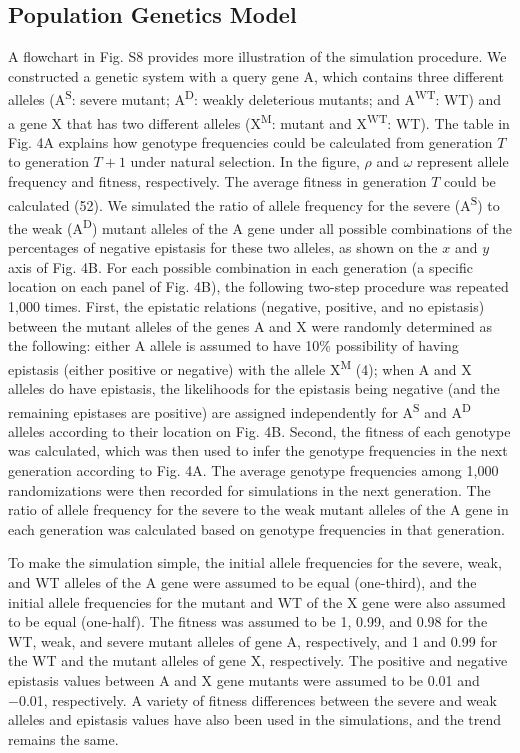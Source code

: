 \subsection{Population Genetics Model} A flowchart in Fig. S8 provides
more illustration of the simulation procedure. We constructed a
genetic system with a query gene A, which contains three different
alleles (A\textsuperscript{S}: severe mutant; A\textsuperscript{D}:
weakly deleterious mutants; and A\textsuperscript{WT}: WT) and a gene
X that has two different alleles (X\textsuperscript{M}: mutant and
X\textsuperscript{WT}: WT). The table in Fig. 4A explains how genotype
frequencies could be calculated from generation $T$ to generation
$T+1$ under natural selection. In the figure, $\rho$ and $\omega$
represent allele frequency and fitness, respectively. The average
fitness in generation $T$ could be calculated (52).  We simulated the
ratio of allele frequency for the severe (A\textsuperscript{S}) to the
weak (A\textsuperscript{D}) mutant alleles of the A gene under all
possible combinations
of the percentages of negative epistasis for these two alleles, as
shown on the $x$ and $y$ axis of Fig. 4B. For each possible
combination in each generation (a specific location on each panel of
Fig. 4B), the following two-step procedure was repeated 1,000
times. First, the epistatic relations (negative, positive, and no
epistasis) between the mutant alleles of the genes A and X were
randomly determined as the following: either A allele is assumed to
have 10\% possibility of having epistasis (either positive or
negative) with the allele X\textsuperscript{M} (4); when A and X
alleles do have epistasis, the likelihoods for the epistasis being
negative (and the remaining epistases are positive) are assigned
independently for A\textsuperscript{S} and A\textsuperscript{D}
alleles according to their location on Fig. 4B. Second, the fitness of
each genotype was calculated, which was then used to infer
the genotype frequencies in the next generation according to
Fig. 4A. The average genotype frequencies among 1,000 randomizations
were then recorded for simulations in the next generation. The ratio
of allele frequency for the severe to the weak mutant alleles of the A
gene in each generation was calculated based on genotype frequencies
in that generation.

To make the simulation simple, the initial allele frequencies for the
severe, weak, and WT alleles of the A gene were assumed to be equal
(one-third), and the initial allele frequencies for the mutant and WT
of the X gene were also assumed to be equal (one-half). The fitness
was assumed to be 1, 0.99, and 0.98 for the WT, weak, and severe
mutant alleles of gene A, respectively, and 1 and 0.99 for the WT and
the mutant alleles of gene X, respectively. The positive and negative
epistasis values between A and X gene mutants were assumed to be 0.01
and −0.01, respectively. A variety of fitness differences between the
severe and weak alleles and epistasis values have also been used in
the simulations, and the trend remains the same.

